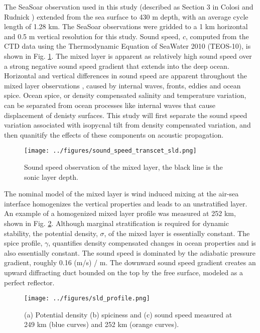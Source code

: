 \documentclass[preprint,NumberedRefs]{JASA}
\begin{document}
The SeaSoar observation used in this study (described as Section 3 in Colosi and Rudnick \citep{colosi2020observations}) extended from the sea surface to 430 m depth, with an average cycle length of 1.28 km. The SeaSoar observations were gridded to a 1 km horizontal and 0.5 m vertical resolution for this study. Sound speed, $c$, computed from the CTD data using the Thermodynamic Equation of SeaWater 2010 (TEOS-10), is shown in Fig. \ref{fig:c_grid}. The mixed layer is apparent as relatively high sound speed over a strong negative sound speed gradient that extends into the deep ocean. Horizontal and vertical differences in sound speed are apparent throughout the mixed layer observations \citep{colosi2020observations}, caused by internal waves, fronts, eddies and ocean spice. Ocean spice, or density compensated salinity and temperature variation, can be separated from ocean processes like internal waves that cause displacement of denisty surfaces\citep{dzieciuch2004}. This study will first separate the sound speed variation associated with isopycnal tilt from density compensated variation, and then quanitify the effects of these components on acoustic propagation.

\begin{figure}
\texttt{[image: ../figures/sound\_speed\_transcet\_sld.png]}
\caption{\label{fig:c_grid}{Sound speed observation of the mixed layer, the black line is the sonic layer depth.}}
\end{figure}

The nominal model of the mixed layer is wind induced mixing at the air-sea interface homogenizes the vertical properties and leads to an unstratified layer. An example of a homogenized mixed layer profile was measured at 252 km, shown in Fig. \ref{fig:profiles}. Although marginal stratification is required for dynamic stability, the potential density, $\sigma$, of the mixed layer is essentially constant. The spice profile, $\gamma$, quantifies density compensated changes in ocean properties and is also essentially constant. The sound speed is dominated by the adiabatic pressure gradient, roughly 0.16 (m/s) / m. The downward sound speed gradient creates an upward diffracting duct bounded on the top by the free surface, modeled as a perfect reflector.

\begin{figure}
\texttt{[image: ../figures/sld\_profile.png]}
    \caption{\label{fig:profiles}{(a) Potential density (b) spiciness and (c) sound speed measured at 249 km (blue curves) and 252 km (orange curves).}}
\end{figure}
\end{document}
